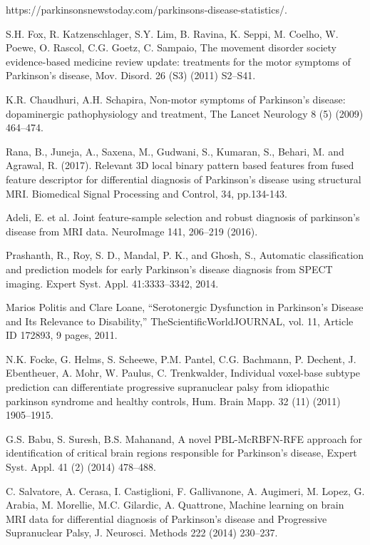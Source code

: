 \documentclass[runningheads,a4paper]{llncs}
\begin{document}
\begin{thebibliography}{4}

 https://parkinsonsnewstoday.com/parkinsons-disease-statistics/.

 S.H. Fox, R. Katzenschlager, S.Y. Lim, B. Ravina, K. Seppi, M. Coelho, W. Poewe,
O. Rascol, C.G. Goetz, C. Sampaio, The movement disorder society
evidence-based medicine review update: treatments for the motor symptoms
of Parkinson’s disease, Mov. Disord. 26 (S3) (2011) S2–S41.


 K.R. Chaudhuri, A.H. Schapira, Non-motor symptoms of Parkinson’s disease:
dopaminergic pathophysiology and treatment, The Lancet Neurology 8 (5)
(2009) 464–474.

 Rana, B., Juneja, A., Saxena, M., Gudwani, S., Kumaran, S., Behari, M. and Agrawal, R. (2017). Relevant 3D local binary pattern based features from fused feature descriptor for differential diagnosis of Parkinson’s disease using structural MRI. Biomedical Signal Processing and Control, 34, pp.134-143.

  Adeli, E. et al. Joint feature-sample selection and robust diagnosis of parkinson’s disease from MRI data. NeuroImage 141, 206–219 (2016).

 Prashanth, R., Roy, S. D., Mandal, P. K., and Ghosh, S., Automatic classification and prediction models for early Parkinson’s disease diagnosis from SPECT imaging. Expert Syst. Appl. 41:3333–3342, 2014.

 Marios Politis and Clare Loane, “Serotonergic Dysfunction in Parkinson's Disease and Its Relevance to Disability,” TheScientificWorldJOURNAL, vol. 11, Article ID 172893, 9 pages, 2011.

 N.K. Focke, G. Helms, S. Scheewe, P.M. Pantel, C.G. Bachmann, P. Dechent, J.
Ebentheuer, A. Mohr, W. Paulus, C. Trenkwalder, Individual voxel-base subtype prediction can differentiate progressive supranuclear palsy from idiopathic parkinson syndrome and healthy controls, Hum. Brain Mapp. 32 (11) (2011) 1905–1915.

 G.S. Babu, S. Suresh, B.S. Mahanand, A novel PBL-McRBFN-RFE approach for identification of critical brain regions responsible for Parkinson’s disease, Expert Syst. Appl. 41 (2) (2014) 478–488.

 C. Salvatore, A. Cerasa, I. Castiglioni, F. Gallivanone, A. Augimeri, M. Lopez, G. Arabia, M. Morellie, M.C. Gilardic, A. Quattrone, Machine learning on brain MRI data for differential diagnosis of Parkinson’s disease and Progressive Supranuclear Palsy, J. Neurosci. Methods 222 (2014) 230–237.


\end{thebibliography}
\end{document}
